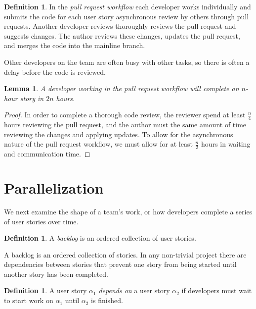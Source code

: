 \documentclass[letterpaper]{article}
\newtheorem{lemma}[theorem]{Lemma}
\theoremstyle{definition}
\newtheorem{definition}[theorem]{Definition}
\begin{document}
    \begin{definition}
        In the \textit{pull request workflow} each developer works individually and submits the code for each user story
        asynchronous review by others through pull requests.
        Another developer reviews thoroughly reviews the pull request and suggests changes.
        The author reviews these changes, updates the pull request, and merges the code into the mainline branch.
    \end{definition}

    Other developers on the team are often busy with other tasks, so there is often a delay before the code is reviewed.

    \begin{lemma}
        \label{lemma:solo}
        A developer working in the pull request workflow will complete an $n$-hour story in $2n$ hours.
    \end{lemma}
    \begin{proof}
        In order to complete a thorough code review, the reviewer spend at least $\frac{n}{4}$ hours reviewing the pull
        request, and the author must the same amount of time reviewing the changes and applying updates.
        To allow for the asynchronous nature of the pull request workflow, we must allow for at least $\frac{n}{2}$
        hours in waiting and communication time.
    \end{proof}


    \section{Parallelization}\label{sec:parallelization}

    We next examine the shape of a team's work, or how developers complete a series of user stories over time.

    \begin{definition}
        A \textit{backlog} is an ordered collection of user stories.
    \end{definition}

    A backlog is an ordered collection of stories.
    In any non-trivial project there are dependencies between stories that prevent one story from being started until
    another story has been completed.

    \begin{definition}
        A user story $\alpha_1$ \textit{depends on} a user story $\alpha_2$ if developers must wait to start work on
        $\alpha_1$ until $\alpha_2$ is finished.
    \end{definition}
\end{document}
